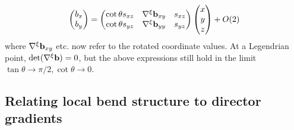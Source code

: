 \begin{align}
\begin{pmatrix}b_x \\ b_y\end{pmatrix} = 
\begin{pmatrix} 
     \cot \theta s_{xz}& \nabla^\xi \mathbf{b}_{xy} &s_{xz}\\
    \cot \theta s_{yz}& \nabla^\xi \mathbf{b}_{yy} & s_{yz}\\ 
\end{pmatrix}
\begin{pmatrix}x \\ y \\ z \end{pmatrix}  
+O(2)
\label{eq:gradbmatrix}
\end{align}
where $\nabla^\xi \mathbf{b}_{xy}$ etc. now refer to the rotated coordinate values. At a Legendrian point, $\mathrm{det}(\nabla^\xi \mathbf{b})=0$, but the above expressions still hold in the limit $\tan \theta \rightarrow \pi/2, \cot \theta \rightarrow 0$.
\subsection{Relating local bend structure to director gradients}

